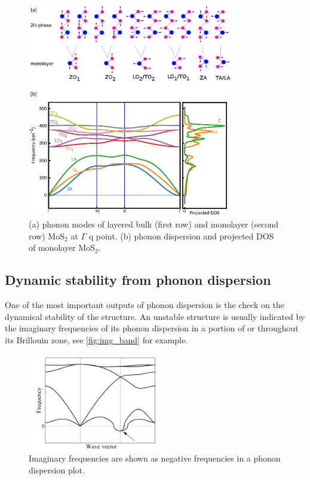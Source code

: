 \begin{figure}[htbp!] 
\centering  
\includegraphics[width=0.8\textwidth]{ph_mos2.eps}
\caption{(a) phonon modes of layered bulk (first row) and monolayer (second row) MoS$_2$ at $\Gamma$ q point. (b) phonon dispersion and projected DOS of monolayer MoS$_2$.}  
\label{fig:mos2_ph}
\end{figure} 


\subsection{Dynamic stability from phonon dispersion}

One of the most important outputs of phonon dispersion is the check on the dynamical stability of the structure. An unstable structure is usually indicated by the imaginary frequencies of its phonon dispersion in a portion of or throughout its Brillouin zone, see \autoref{fig:img_band} for example. 


\begin{figure}[htbp!] 
\centering  
\includegraphics[width=0.5\textwidth]{img_band.png}
\caption{ Imaginary frequencies are shown as negative frequencies in a phonon dispersion plot.}  
\label{fig:img_band}
\end{figure} 

